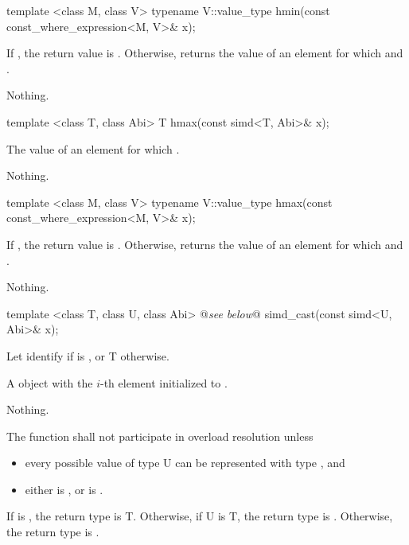 \begin{itemdecl}
template <class M, class V> typename V::value_type hmin(const const_where_expression<M, V>& x);
\end{itemdecl}
\begin{itemdescr}
  \pnum\returns If , the return value is .
  Otherwise, returns the value of an element  for which  and  .

  \pnum\throws Nothing.
\end{itemdescr}

\begin{itemdecl}
template <class T, class Abi> T hmax(const simd<T, Abi>& x);
\end{itemdecl}
\begin{itemdescr}
  \pnum\returns The value of an element  for which  \foralli.

  \pnum\throws Nothing.
\end{itemdescr}

\begin{itemdecl}
template <class M, class V> typename V::value_type hmax(const const_where_expression<M, V>& x);
\end{itemdecl}
\begin{itemdescr}
  \pnum\returns If , the return value is .
  Otherwise, returns the value of an element  for which  and  .

  \pnum\throws Nothing.
\end{itemdescr}


\begin{itemdecl}
  template <class T, class U, class Abi> @\emph{see below}@ simd_cast(const simd<U, Abi>& x);
\end{itemdecl}
\begin{itemdescr}
  \pnum Let  identify  if  is \true, or \type T otherwise.

  \pnum\returns A \simd object with the $i$-th element initialized to .

  \pnum\throws Nothing.

  \pnum\remarks The function shall not participate in overload resolution unless
  \begin{itemize}
    \item every possible value of type \type U can be represented with type , and
    \item either  is \false, or  is \true.
  \end{itemize}
  If  is \true, the return type is \type T.
  Otherwise, if \type U is \type T, the return type is \simd[<T, Abi>].
  Otherwise, the return type is .

\end{itemdescr}

